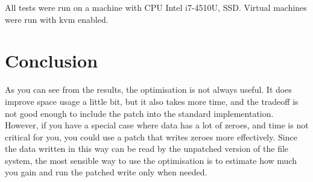 \documentclass{sig-alternate-05-2015}
\begin{document}
All tests were run on a machine with CPU Intel i7-4510U, SSD.
Virtual machines were run with kvm enabled.

\section{Conclusion}

As you can see from the results, the optimisation is not always useful.
It does improve space usage a little bit, but it also takes more time, and the tradeoff is
not good enough to include the patch into the standard implementation.
However, if you have a special case where data
has a lot of zeroes, and time is not critical for you, you could use a patch that writes zeroes
more effectively. Since the data written in this way can be read by the unpatched version of the 
file system, the most sensible way to use the optimisation is 
to estimate how much you gain and run the patched write only when needed.



\end{document}
